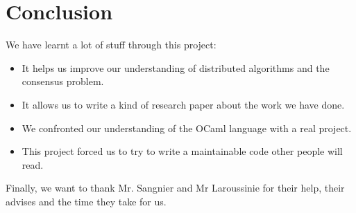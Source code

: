 \documentclass{article}
\begin{document}
\newpage

\section{Conclusion}
We have learnt a lot of stuff through this project:
\begin{itemize}
  \item It helps us improve our understanding of distributed algorithms and the consensus problem.
  \item It allows us to write a kind of research paper about the work we have done.
  \item We confronted our understanding of the OCaml language with a real project.
  \item This project forced us to try to write a maintainable code other people will read.
\end{itemize}
Finally, we want to thank Mr. Sangnier and Mr Laroussinie for their help, their advises and the time they take for us.
\end{document}
